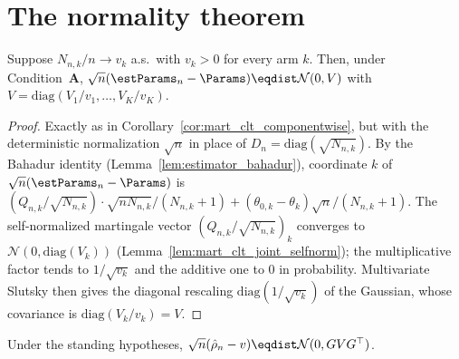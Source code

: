 \section{The normality theorem}
\label{sec:norm_main}

\begin{lemma}\label{lem:clt_theta}
\leanok
{}
Suppose $N_{n,k}/n\to v_k$ a.s.\ with $v_k>0$ for every arm $k$. Then, under
Condition~\textbf{A}, $\sqrt n(\estParams_n - \Params)\eqdist\mathcal{N}(0,V)$ with
$V=\mathrm{diag}(V_1/v_1,\dots,V_K/v_K)$.
\end{lemma}

\begin{proof}\leanok
{}
Exactly as in Corollary~\ref{cor:mart_clt_componentwise}, but with the deterministic
normalization $\sqrt n$ in place of $D_n=\mathrm{diag}(\sqrt{N_{n,k}})$. By the Bahadur
identity (Lemma~\ref{lem:estimator_bahadur}), coordinate $k$ of
$\sqrt n(\estParams_n-\Params)$ is
$(Q_{n,k}/\sqrt{N_{n,k}})\cdot\sqrt{nN_{n,k}}/(N_{n,k}+1)
 + (\theta_{0,k}-\theta_k)\sqrt n/(N_{n,k}+1)$. The self-normalized martingale vector
$(Q_{n,k}/\sqrt{N_{n,k}})_k$ converges to $\mathcal N(0,\mathrm{diag}(V_k))$
(Lemma~\ref{lem:mart_clt_joint_selfnorm}); the multiplicative factor tends to $1/\sqrt{v_k}$ and
the additive one to $0$ in probability. Multivariate Slutsky then gives the diagonal rescaling
$\mathrm{diag}(1/\sqrt{v_k})$ of the Gaussian, whose covariance is $\mathrm{diag}(V_k/v_k)=V$.
\end{proof}

\begin{lemma}\label{lem:clt_rho}
\leanok
{}
Under the standing hypotheses, $\sqrt n(\hat{\rho}_n - v)\eqdist\mathcal{N}(0,GVG^\top)$.
\end{lemma}

